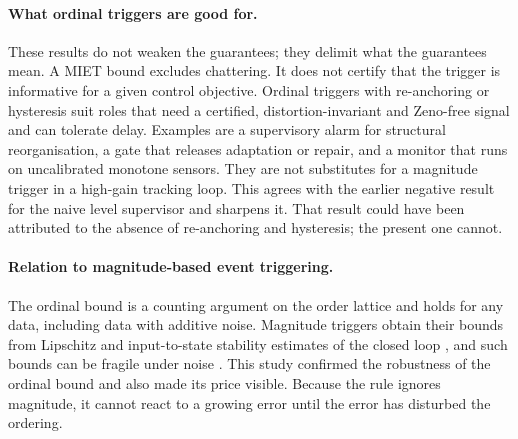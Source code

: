 \documentclass[10pt,a4paper]{article}
\begin{document}
\paragraph{What ordinal triggers are good for.} These results do not weaken the guarantees; they delimit what the guarantees mean. A MIET bound excludes chattering. It does not certify that the trigger is informative for a given control objective. Ordinal triggers with re-anchoring or hysteresis suit roles that need a certified, distortion-invariant and Zeno-free signal and can tolerate delay. Examples are a supervisory alarm for structural reorganisation, a gate that releases adaptation or repair, and a monitor that runs on uncalibrated monotone sensors. They are not substitutes for a magnitude trigger in a high-gain tracking loop. This agrees with the earlier negative result for the naive level supervisor \citep{pv2026miet} and sharpens it. That result could have been attributed to the absence of re-anchoring and hysteresis; the present one cannot.

\paragraph{Relation to magnitude-based event triggering.} The ordinal bound is a counting argument on the order lattice and holds for any data, including data with additive noise. Magnitude triggers obtain their bounds from Lipschitz and input-to-state stability estimates of the closed loop \citep{tabuada2007,girard2015}, and such bounds can be fragile under noise \citep{borgers2014}. This study confirmed the robustness of the ordinal bound and also made its price visible. Because the rule ignores magnitude, it cannot react to a growing error until the error has disturbed the ordering.
\end{document}
